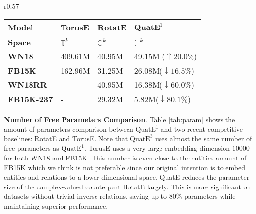 \documentclass{article}
\begin{document}
\begin{wraptable}{r}{0.57\textwidth}
\centering
\caption{Number of free parameters comparison.}
\small
\begin{tabular}{llll}
\hline
\textbf{Model}   & TorusE  & RotatE &  $\textbf{QuatE}^1$  \\ \hline
  \textbf{Space}  & $\mathbb{T}^k$  &   $\mathbb{C}^k$     &   $\mathbb{H}^k$  \\
 \textbf{WN18}   & 409.61M &   40.95M      & 49.15M ($\uparrow20.0\%$)    \\
  \textbf{FB15K}   & 162.96M&31.25M       &26.08M($\downarrow16.5\%$)  \\
   \textbf{WN18RR}   &-&   40.95M      & 16.38M($\downarrow60.0\%$) \\
 \textbf{FB15K-237} &-  &   29.32M &    5.82M($\downarrow80.1\%$)    \\ \hline
\end{tabular}
\vspace{-1em}
\label{tab:param}
\end{wraptable}
\textbf{Number of Free Parameters Comparison}. Table \ref{tab:param} shows the amount of parameters comparison between $\text{QuatE}^1$ and two recent competitive baselines: RotatE and TorusE. Note that $\text{QuatE}^3$ uses almost the same number of free parameters as $\text{QuatE}^1$. TorusE uses a very large embedding dimension $10000$ for both WN18 and FB15K. This number is even close to the entities amount of FB15K which we think is not preferable since our original intention is to embed entities and relations to a lower dimensional space. QuatE reduces the parameter size of the complex-valued counterpart RotatE largely. This is more significant on datasets without trivial inverse relations, saving up to $80\%$ parameters while maintaining superior performance.
\end{document}
